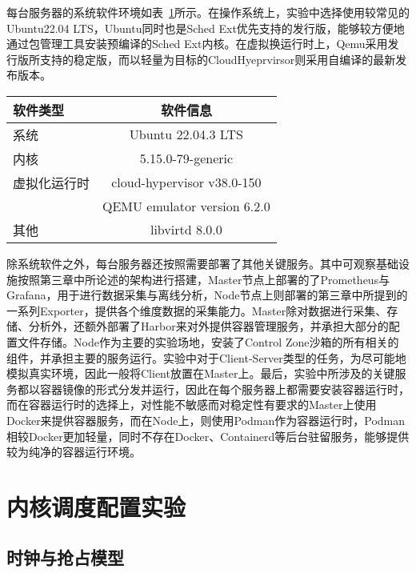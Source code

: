 每台服务器的系统软件环境如表~\ref{tab:system_env}所示。在操作系统上，实验中选择使用较常见的Ubuntu22.04 LTS，Ubuntu同时也是Sched Ext优先支持的发行版，能够较方便地通过包管理工具安装预编译的Sched Ext内核。在虚拟换运行时上，Qemu采用发行版所支持的稳定版，而以轻量为目标的CloudHyeprvirsor则采用自编译的最新发布版本。

\begin{table}
    \label{tab:system_env}
    \footnotesize%
    \setlength{\tabcolsep}{4pt}%
    \renewcommand{\arraystretch}{1.5}%
    \centering
    \begin{tabular}{lc}
        \hline
        软件类型 & 软件信息 \\
        \hline
        系统 & Ubuntu 22.04.3 LTS  \\
        内核 & 5.15.0-79-generic \\
        虚拟化运行时 & cloud-hypervisor v38.0-150 \\
                   & QEMU emulator version 6.2.0 \\
        其他        & libvirtd 8.0.0 \\
        \hline
    \end{tabular}
\end{table}

除系统软件之外，每台服务器还按照需要部署了其他关键服务。其中可观察基础设施按照第三章中所论述的架构进行搭建，Master节点上部署的了Prometheus与Grafana，用于进行数据采集与离线分析，Node节点上则部署的第三章中所提到的一系列Exporter，提供各个维度数据的采集能力。Master除对数据进行采集、存储、分析外，还额外部署了Harbor来对外提供容器管理服务，并承担大部分的配置文件存储。Node作为主要的实验场地，安装了Control Zone沙箱的所有相关的组件，并承担主要的服务运行。实验中对于Client-Server类型的任务，为尽可能地模拟真实环境，因此一般将Client放置在Master上。最后，实验中所涉及的关键服务都以容器镜像的形式分发并运行，因此在每个服务器上都需要安装容器运行时，而在容器运行时的选择上，对性能不敏感而对稳定性有要求的Master上使用Docker来提供容器服务，而在Node上，则使用Podman作为容器运行时，Podman相较Docker更加轻量，同时不存在Docker、Containerd等后台驻留服务，能够提供较为纯净的容器运行环境。

\section{内核调度配置实验}

\subsection{时钟与抢占模型}


